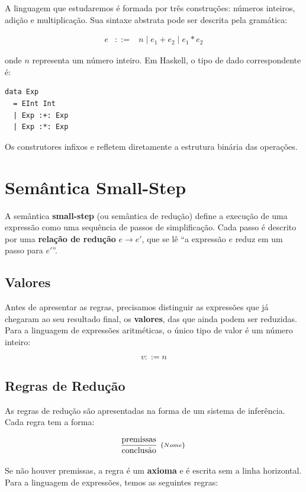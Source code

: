 A linguagem que estudaremos é formada por três construções: números
inteiros, adição e multiplicação. Sua sintaxe abstrata pode ser
descrita pela gramática:

\[
  \begin{array}{lcl}
    e & ::= & n \mid e_1 + e_2 \mid e_1 * e_2
  \end{array}
\]

onde \(n\) representa um número inteiro. Em Haskell, o tipo de dado
correspondente é:

\begin{verbatim}
data Exp
  = EInt Int
  | Exp :+: Exp
  | Exp :*: Exp
\end{verbatim}

Os construtores infixos \haskell{(:+:)} e
\haskell{(:*:)} refletem diretamente a estrutura
binária das operações.

\section{Semântica Small-Step}

A semântica \textbf{small-step} (ou semântica de redução) define a
execução de uma expressão como uma sequência de passos de
simplificação. Cada passo é descrito por uma \textbf{relação de
redução} \(e \to e'\), que se lê ``a expressão \(e\) reduz em um
passo para \(e'\)''.

\subsection{Valores}

Antes de apresentar as regras, precisamos distinguir as expressões
que já chegaram ao seu resultado final, os \textbf{valores},
das que ainda podem ser reduzidas. Para a linguagem de expressões
aritméticas, o único tipo de valor é um número inteiro:

\[
  v ::= n
\]

\subsection{Regras de Redução}

As regras de redução são apresentadas na forma de um sistema de
inferência. Cada regra tem a forma:

\[
  \infer[_{\{Nome\}}]{\text{conclusão}}{\text{premissas}}
\]

Se não houver premissas, a regra é um \textbf{axioma} e é escrita sem
a linha horizontal. Para a linguagem de expressões, temos as seguintes regras:

